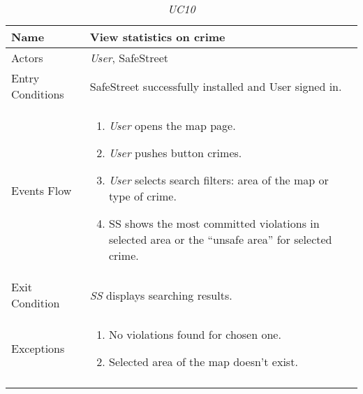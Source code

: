 \documentclass[../../../RASD.tex]{subfiles}
\begin{document}
    \begin{center}
        \begin{longtable}{| p{.35\linewidth} | p{.65\linewidth} |}
            \hline
            \textbf{Name} & \textbf{View statistics on crime}\\ \hline
            Actors & \textit{User}, SafeStreet\\ \hline
            Entry Conditions & SafeStreet successfully installed and User signed in.\\ \hline
            Events Flow &
            \begin{enumerate}
                \item \textit{User} opens the map page.
                \item \textit{User} pushes button crimes.
                \item \textit{User} selects search filters: area of the map or type of crime.
                \item  SS shows the most committed violations in selected area or the “unsafe area” for selected crime.
            \end{enumerate}
            \\ \hline
            Exit Condition & \textit{SS} displays searching results.\\ \hline
            Exceptions &
            \begin{enumerate}
                \item No violations found for chosen one.
                \item Selected area of the map doesn’t exist.
            \end{enumerate}
            \\
            \hline
            \caption[\textit{Use Case 10}]{\textit{UC10}}
        \end{longtable}
    \end{center}
    \newpage
\end{document}
